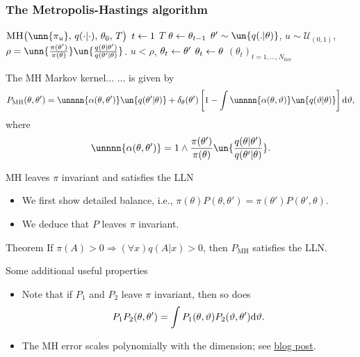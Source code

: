 \documentclass[10pt]{beamer}
\let\oldcitep=\citep
\renewcommand\citep[1]{\hyperlink{#1}{\textcolor{vert}{\oldcitep{#1}}}}
\begin{document}
\begin{frame}
\frametitle{The Metropolis-Hastings algorithm}
\begin{algorithm}{$\Algo{MH}\big(\unn{\pi_u},\, q(\cdot\vert\cdot),\,\theta_{0},\, T\big)$}
\Aitem \For $t\leftarrow1$ \To $T$
\Aitem \mt $\theta\leftarrow\theta_{t-1}$
\Aitem \mt $\theta'\sim \un{q(.\vert\theta)}$, $u\sim\mathcal U_{(0,1)}$,
\Aitem \mt $\rho =  \unn{\frac{\pi(\theta')}{\pi(\theta)}} \un{\frac{q(\theta\vert\theta')}{q(\theta'\vert\theta)}}$.
\Aitem \mt \If $u<\rho$,
\Aitem \mtt $\theta_{t}\leftarrow\theta'$
\mt {}
\Aitem \mt \Else $\theta_{t}\leftarrow\theta$
\mt {} \label{ai:acceptanceEnd}
\Aitem
\Return $(\theta_{t})_{t=1,\dots,N_{\text{iter}}}$
\end{algorithm}
\end{frame}

\begin{frame}{The MH Markov kernel...}
... is given by
  $$
P_{\text{MH}}(\theta,\theta') = \unnnn{\alpha(\theta,\theta')} \un{q(\theta'\vert\theta)} + \delta_\theta(\theta')\left[1-\int \unnnn{\alpha(\theta,\vartheta)}\un{q(\vartheta\vert\theta)}\right]\d\vartheta,
$$
where
$$
\unnnn{\alpha(\theta,\theta')} = 1\wedge \frac{\pi(\theta')}{\pi(\theta)} \un{\frac{q(\theta\vert\theta')}{q(\theta'\vert\theta)}}.
$$
\blank
\end{frame}

\begin{frame}{MH leaves $\pi$ invariant and satisfies the LLN}
\begin{itemize}
  \item We first show detailed balance, i.e., $\pi(\theta)P(\theta,\theta') = \pi(\theta')P(\theta',\theta).$
  \vfill
  \vfill
  \vfill
  \vfill
  \item We deduce that $P$ leaves $\pi$ invariant.
  \vfill
  \vfill
  \vfill
  \vfill
\end{itemize}
\vfill
\begin{block}{Theorem \citep{RoCa04}}
  If $\pi(A)>0\Rightarrow (\forall x) q(A\vert x)>0$, then $P_{\text{MH}}$ satisfies the LLN.
\end{block}
\begin{exampleblock}{Some additional useful properties}
  \begin{itemize}
    \item Note that if $P_1$ and $P_2$ leave $\pi$ invariant, then so does
    $$
    P_1P_2 (\theta,\theta') = \int P_1(\theta,\vartheta)P_2(\vartheta,\theta'){\rm d}\vartheta.
    $$
    \item The MH error scales polynomially with the dimension; see \href{https://statisfaction.wordpress.com/2018/05/15/scaling-of-mcmc-with-dimension-experiments/}{blog post}.
  \end{itemize}
\end{exampleblock}
\end{frame}
\end{document}
